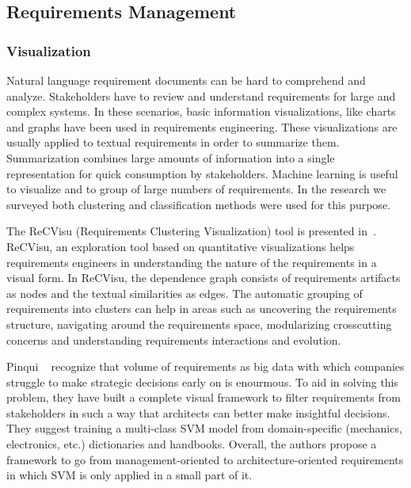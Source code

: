 \subsection{Requirements Management}


\subsubsection{Visualization}

Natural language requirement documents can be hard to comprehend and analyze.
Stakeholders have to review and understand requirements for large and
complex systems. In these scenarios, basic information visualizations, like
charts and graphs have been used in requirements engineering. These
visualizations are usually applied to textual requirements in order to summarize
them. Summarization combines large amounts of information into a
single representation for quick consumption by stakeholders\cite{Reddivari:2012}.
Machine learning is useful to visualize and to group of large numbers of
requirements. In the research we surveyed both clustering and classification
methods were used for this purpose.

The ReCVisu (Requirements Clustering Visualization) tool is presented
in~\cite{Reddivari:2012}. ReCVisu, an exploration tool based on quantitative
visualizations helps requirements engineers in understanding the nature of the
requirements in a visual form. In ReCVisu, the dependence graph consists of
requirements artifacts as nodes and the textual similarities as edges. The
automatic grouping of requirements into clusters can help in areas such as
uncovering the requirements structure, navigating around the requirements space,
modularizing crosscutting concerns and understanding requirements interactions
and evolution.

Pinqui \etal~\cite{Pinqui:2015} recognize that volume of requirements as big
data with which companies struggle to make strategic decisions early on is
enourmous. To aid in solving this problem, they have built a complete visual
framework to filter requirements from stakeholders in such a way that architects
can better make insightful decisions. They suggest training a multi-class SVM
model from domain-specific (mechanics, electronics, etc.) dictionaries and handbooks.
Overall, the authors propose a framework to go from management-oriented to
architecture-oriented requirements in which SVM is only applied in a small part
of it.

